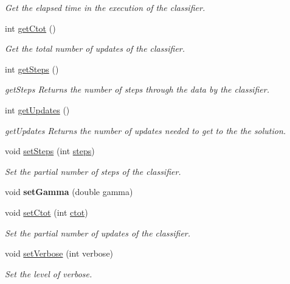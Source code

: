 \begin{DoxyCompactItemize}
\begin{DoxyCompactList}\small\item\em Get the elapsed time in the execution of the classifier. \end{DoxyCompactList}\item 
int \hyperlink{class_classifier_aefd89af30ccd3e38194946bacecdf82a}{get\+Ctot} ()
\begin{DoxyCompactList}\small\item\em Get the total number of updates of the classifier. \end{DoxyCompactList}\item 
int \hyperlink{class_classifier_a6e6d5041d6945bc62581323d2d3b5ab1}{get\+Steps} ()
\begin{DoxyCompactList}\small\item\em get\+Steps Returns the number of steps through the data by the classifier. \end{DoxyCompactList}\item 
int \hyperlink{class_classifier_abde870e234b342455e113e05900f7339}{get\+Updates} ()
\begin{DoxyCompactList}\small\item\em get\+Updates Returns the number of updates needed to get to the the solution. \end{DoxyCompactList}\item 
void \hyperlink{class_classifier_a55c37a2a00b3dce578d6fde547376dae}{set\+Steps} (int \hyperlink{class_classifier_a154ed9ff7a3d989ed25dda7215289f64}{steps})
\begin{DoxyCompactList}\small\item\em Set the partial number of steps of the classifier. \end{DoxyCompactList}\item 
\mbox{\label{class_classifier_a8ce9a9a19a9deceb12e39e54ef595650}} 
void {\bfseries set\+Gamma} (double gamma)
\item 
void \hyperlink{class_classifier_a318ff28416f40269c532a80827fb30fb}{set\+Ctot} (int \hyperlink{class_classifier_af3bc30b5c675507c12b23fbbc7164093}{ctot})
\begin{DoxyCompactList}\small\item\em Set the partial number of updates of the classifier. \end{DoxyCompactList}\item 
void \hyperlink{class_classifier_ac9e142714dff18a8caa5c9e3d7cfcbfc}{set\+Verbose} (int verbose)
\begin{DoxyCompactList}\small\item\em Set the level of verbose. \end{DoxyCompactList}\item 

\end{DoxyCompactItemize}
